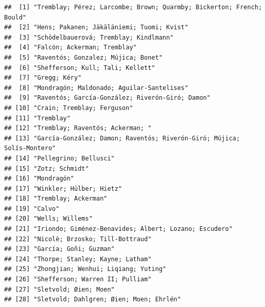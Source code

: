 \documentclass[
]{book}
\newenvironment{Shaded}{\begin{snugshade}}{\end{snugshade}}
\newcommand{\FunctionTok}[1]{\textcolor[rgb]{0.13,0.29,0.53}{\textbf{#1}}}
\newcommand{\NormalTok}[1]{#1}
\newcommand{\SpecialCharTok}[1]{\textcolor[rgb]{0.81,0.36,0.00}{\textbf{#1}}}
\theoremstyle{definition}
\theoremstyle{definition}
\theoremstyle{definition}
\theoremstyle{definition}
\theoremstyle{remark}
\begin{document}
\begin{Shaded}
\end{Shaded}

\begin{verbatim}
##  [1] "Tremblay; Pérez; Larcombe; Brown; Quarmby; Bickerton; French; Bould"  
##  [2] "Hens; Pakanen; Jäkäläniemi; Tuomi; Kvist"                             
##  [3] "Schödelbauerová; Tremblay; Kindlmann"                                 
##  [4] "Falcón; Ackerman; Tremblay"                                           
##  [5] "Raventós; Gonzalez; Mújica; Bonet"                                    
##  [6] "Shefferson; Kull; Tali; Kellett"                                      
##  [7] "Gregg; Kéry"                                                          
##  [8] "Mondragón; Maldonado; Aguilar-Santelises"                             
##  [9] "Raventós; García-González; Riverón-Giró; Damon"                       
## [10] "Crain; Tremblay; Ferguson"                                            
## [11] "Tremblay"                                                             
## [12] "Tremblay; Raventós; Ackerman; "                                       
## [13] "García-González; Damon; Raventós; Riverón-Giró; Mújica; Solís-Montero"
## [14] "Pellegrino; Bellusci"                                                 
## [15] "Zotz; Schmidt"                                                        
## [16] "Mondragón"                                                            
## [17] "Winkler; Hülber; Hietz"                                               
## [18] "Tremblay; Ackerman"                                                   
## [19] "Calvo"                                                                
## [20] "Wells; Willems"                                                       
## [21] "Iriondo; Giménez-Benavides; Albert; Lozano; Escudero"                 
## [22] "Nicolè; Brzosko; Till-Bottraud"                                       
## [23] "García; Goñi; Guzman"                                                 
## [24] "Thorpe; Stanley; Kayne; Latham"                                       
## [25] "Zhongjian; Wenhui; Liqiang; Yuting"                                   
## [26] "Shefferson; Warren II; Pulliam"                                       
## [27] "Sletvold; Øien; Moen"                                                 
## [28] "Sletvold; Dahlgren; Øien; Moen; Ehrlén"                               

\end{verbatim}
\end{document}
